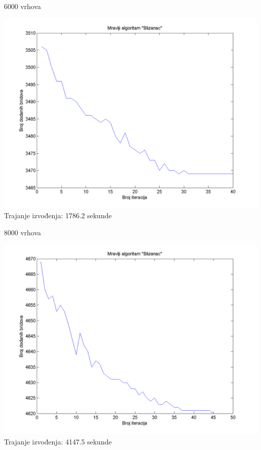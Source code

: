 \documentclass{beamer}
\begin{document}
\begin{frame}{6000 vrhova}
\begin{center}
\includegraphics[scale = 0.45]{3.png}\\
Trajanje izvođenja: 1786.2 sekunde\\
\end{center}
\end{frame}

\begin{frame}{8000 vrhova}
\begin{center}
\includegraphics[scale = 0.45]{4.png}\\
Trajanje izvođenja: 4147.5 sekunde\\
\end{center}
\end{frame}
\end{document}

